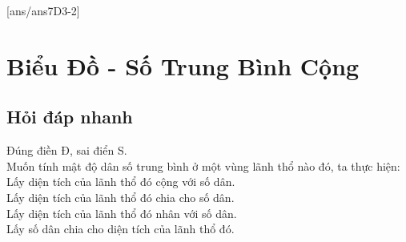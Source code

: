 
[ans/ans7D3-2]
\section{Biểu Đồ - Số Trung Bình Cộng}

\subsection{Hỏi đáp nhanh}

	\begin{ex}%
		Đúng điền Đ, sai điển S.\\
		Muốn tính mật độ dân số trung bình ở một vùng lãnh thổ nào đó, ta thực hiện:\\
		 Lấy diện tích của lãnh thổ đó cộng với số dân.\\
		 Lấy diện tích của lãnh thổ đó chia cho số dân.\\
		 Lấy diện tích của lãnh thổ đó nhân với số dân.\\
		 Lấy số dân chia cho diện tích của lãnh thổ đó.\\
	\end{ex}

